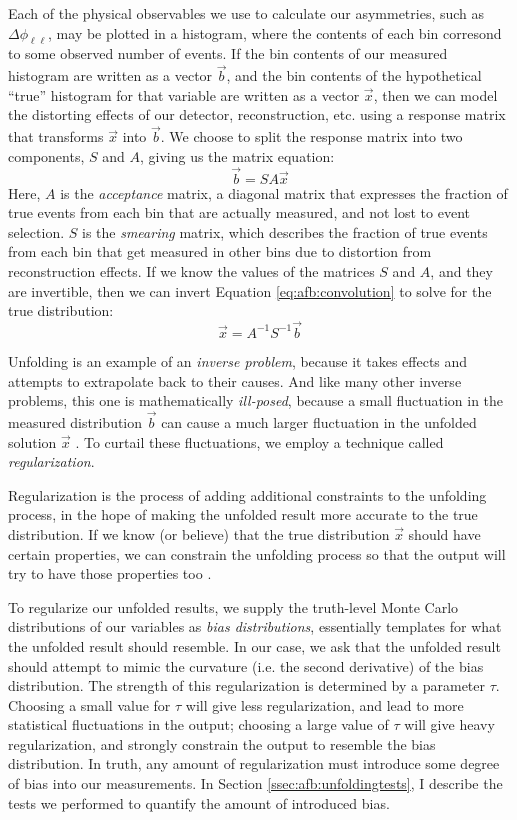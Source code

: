 Each of the physical observables we use to calculate our asymmetries,
such as $\Delta \phi_{\ell\ell}$, may be plotted in a histogram, where
the contents of each bin corresond to some observed number of
events. If the bin contents of our measured histogram are written as a
vector $\vec{b}$, and the bin contents of the hypothetical ``true''
histogram for that variable are written as a vector $\vec{x}$, then we can model the
distorting effects of our detector, reconstruction, etc. using a response
matrix that transforms $\vec{x}$ into $\vec{b}$. We choose to split the
response matrix into two components, $S$ and $A$, giving us the matrix equation:
\begin{equation}
\vec{b} = S A \vec{x}
\label{eq:afb:convolution}
\end{equation}
Here, $A$ is the \emph{acceptance} matrix, a diagonal
matrix that expresses the fraction of true events from each bin that
are actually measured, and not lost to event selection. $S$ is the \emph{smearing}
matrix, which describes the fraction of true events from each bin that
get measured in other bins due to distortion from reconstruction
effects. If we know the values of the matrices $S$ and
$A$, and they are invertible, then we can invert Equation
\ref{eq:afb:convolution} to solve for the true distribution:
\begin{equation}
\vec{x} = A^{-1} S^{-1} \vec{b}
\label{eq:afb:deconvolution}
\end{equation}

Unfolding is an example of an \emph{inverse problem}, because it takes
effects and attempts to extrapolate back to their causes. And like
many other inverse problems, this one is mathematically
\emph{ill-posed}, because a small fluctuation in the measured
distribution $\vec{b}$ can cause a much larger fluctuation in the
unfolded solution $\vec{x}$ \cite{blobelseminar}. To curtail these
fluctuations, we employ a technique called \emph{regularization}.

Regularization is the process of adding additional constraints to the
unfolding process, in the hope of making the unfolded result more
accurate to the true distribution. If we know (or believe) that the
true distribution $\vec{x}$ should have certain properties, we can
constrain the unfolding process so that the output will try to have
those properties too \cite{unfoldingcowan}.

To regularize our unfolded results, we supply the truth-level Monte
Carlo distributions of our variables as \emph{bias distributions},
essentially templates for what the unfolded result should
resemble. In our case, we ask that the unfolded result should attempt
to mimic the curvature (i.e. the second derivative) of the bias
distribution. The strength of this regularization is determined by a
parameter $\tau$. Choosing a small value for $\tau$ will give less
regularization, and lead to more statistical fluctuations in the
output; choosing a large value of $\tau$ will give heavy
regularization, and strongly constrain the output to resemble the bias
distribution. In truth, any amount of regularization must introduce
some degree of bias into our measurements. In Section
\ref{ssec:afb:unfoldingtests}, I describe the tests we performed to
quantify the amount of introduced bias.

